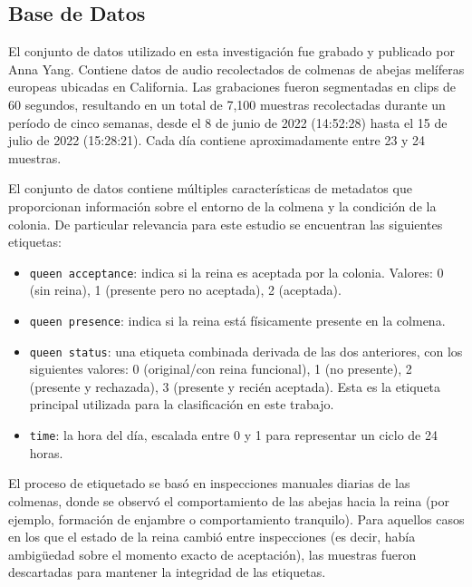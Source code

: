 \documentclass[12pt]{report}
\begin{document}
\subsection{Base de Datos}

El conjunto de datos utilizado en esta investigación fue grabado y publicado por Anna Yang\cite{AnnaYang-Dataset}. Contiene datos de audio recolectados de colmenas de abejas melíferas europeas ubicadas en California. Las grabaciones fueron segmentadas en clips de 60 segundos, resultando en un total de 7,100 muestras recolectadas durante un período de cinco semanas, desde el 8 de junio de 2022 (14:52:28) hasta el 15 de julio de 2022 (15:28:21). Cada día contiene aproximadamente entre 23 y 24 muestras.

El conjunto de datos contiene múltiples características de metadatos que proporcionan información sobre el entorno de la colmena y la condición de la colonia. De particular relevancia para este estudio se encuentran las siguientes etiquetas:

\begin{itemize}
	\item[\ding{43}] \texttt{queen acceptance}: indica si la reina es aceptada por la colonia. Valores: 0 (sin reina), 1 (presente pero no aceptada), 2 (aceptada).
	\item[\ding{43}] \texttt{queen presence}: indica si la reina está físicamente presente en la colmena.
	\item[\ding{43}] \texttt{queen status}: una etiqueta combinada derivada de las dos anteriores, con los siguientes valores: 0 (original/con reina funcional), 1 (no presente), 2 (presente y rechazada), 3 (presente y recién aceptada). Esta es la etiqueta principal utilizada para la clasificación en este trabajo.
	\item[\ding{43}] \texttt{time}: la hora del día, escalada entre 0 y 1 para representar un ciclo de 24 horas.
\end{itemize}

El proceso de etiquetado se basó en inspecciones manuales diarias de las colmenas, donde se observó el comportamiento de las abejas hacia la reina (por ejemplo, formación de enjambre o comportamiento tranquilo). Para aquellos casos en los que el estado de la reina cambió entre inspecciones (es decir, había ambigüedad sobre el momento exacto de aceptación), las muestras fueron descartadas para mantener la integridad de las etiquetas.

\pagebreak
{}
\printbibliography
\thispagestyle{empty}
\end{document}
